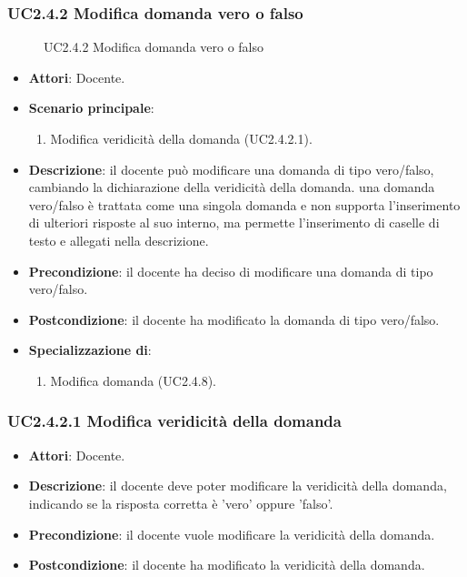 \subsubsection{UC2.4.2 Modifica domanda vero o falso}
\begin{figure}[H]
\centering
\noindent{}
\caption{UC2.4.2 Modifica domanda vero o falso}
\end{figure}
\begin{itemize}
\item \textbf{Attori}: Docente.
\item \textbf{Scenario principale}:
\begin{enumerate}
\item Modifica veridicità della domanda (UC2.4.2.1).
\end{enumerate}
\item \textbf{Descrizione}: il docente può modificare una domanda di tipo vero/falso, cambiando la dichiarazione della veridicità della domanda. una domanda vero/falso è trattata come una singola domanda e non supporta l'inserimento di ulteriori risposte al suo interno, ma permette l'inserimento di caselle di testo e allegati nella descrizione.
\item \textbf{Precondizione}: il docente ha deciso di modificare una domanda di tipo vero/falso.
\item \textbf{Postcondizione}: il docente ha modificato la domanda di tipo vero/falso.
\item \textbf{Specializzazione di}:
\begin{enumerate}
\item Modifica domanda (UC2.4.8).
\end{enumerate}
\end{itemize}
\subsubsection{UC2.4.2.1 Modifica veridicità della domanda}
\begin{itemize}
\item \textbf{Attori}: Docente.
\item \textbf{Descrizione}: il docente deve poter modificare la veridicità della domanda, indicando se la risposta corretta è 'vero' oppure 'falso'.
\item \textbf{Precondizione}: il docente vuole modificare la veridicità della domanda.
\item \textbf{Postcondizione}: il docente ha modificato la veridicità della domanda.
\end{itemize}
